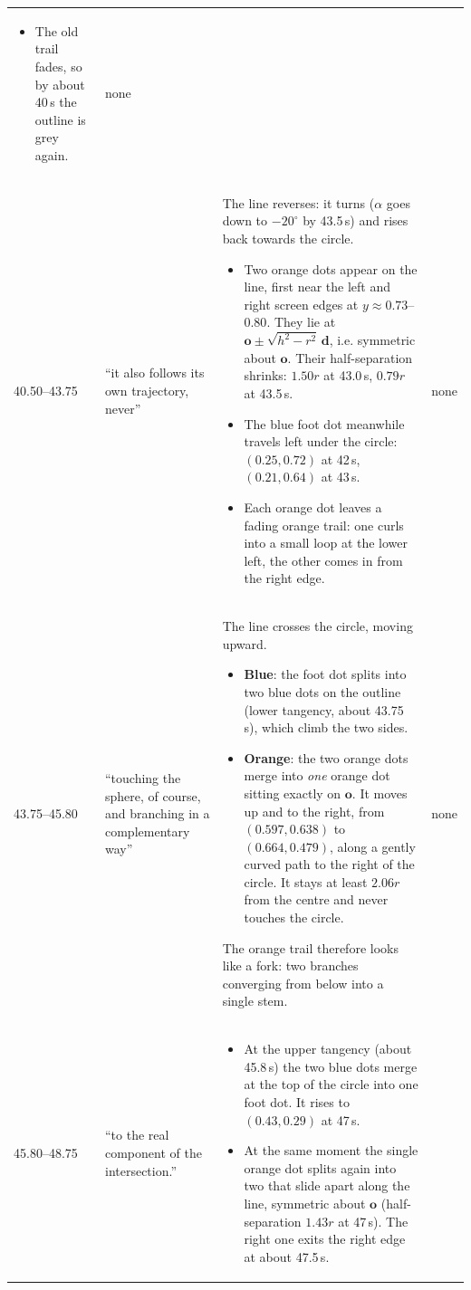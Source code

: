 \documentclass[10pt,a4paper]{article}
\newcommand{\vo}{\mathbf{o}}\newcommand{\vd}{\mathbf{d}}\newcommand{\vp}{\mathbf{p}}
\begin{document}
\begin{longtable}{@{}p{14mm}p{38mm}p{80mm}p{28mm}@{}}
\begin{itemize}
\item The old trail fades, so by about 40\,s the outline is grey again.
\end{itemize} & none\\
40.50--43.75 & ``it also follows its own trajectory, never'' &
The line reverses: it turns ($\alpha$ goes down to $-20^\circ$ by 43.5\,s) and rises back towards the circle.
\begin{itemize}
\item \textcolor{orange!90!black}{Two orange dots} appear on the line, first near the left and right screen edges at $y\approx0.73$--$0.80$. They lie at $\vo\pm\sqrt{h^2-r^2}\,\vd$, i.e. symmetric about $\vo$. Their half-separation shrinks: $1.50r$ at 43.0\,s, $0.79r$ at 43.5\,s.
\item The blue foot dot meanwhile travels left under the circle: $(0.25,0.72)$ at 42\,s, $(0.21,0.64)$ at 43\,s.
\item Each orange dot leaves a fading orange trail: one curls into a small loop at the lower left, the other comes in from the right edge.
\end{itemize} & none\\
43.75--45.80 & ``touching the sphere, of course, and branching in a complementary way'' &
The line crosses the circle, moving upward.
\begin{itemize}
\item \textbf{Blue}: the foot dot splits into two blue dots on the outline (lower tangency, about 43.75\,s), which climb the two sides.
\item \textbf{Orange}: the two orange dots merge into \emph{one} orange dot sitting exactly on $\vo$. It moves up and to the right, from $(0.597,0.638)$ to $(0.664,0.479)$, along a gently curved path to the right of the circle. It stays at least $2.06r$ from the centre and never touches the circle.
\end{itemize}
The orange trail therefore looks like a fork: two branches converging from below into a single stem. & none\\
45.80--48.75 & ``to the real component of the intersection.'' &
\begin{itemize}
\item At the upper tangency (about 45.8\,s) the two blue dots merge at the top of the circle into one foot dot. It rises to $(0.43,0.29)$ at 47\,s.
\item At the same moment the single orange dot splits again into two that slide apart along the line, symmetric about $\vo$ (half-separation $1.43r$ at 47\,s). The right one exits the right edge at about 47.5\,s.

\end{itemize}
\end{longtable}
\end{document}
